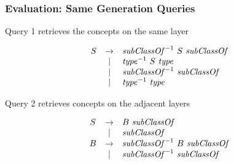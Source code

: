 \documentclass[xcolor=table]{beamer}
\begin{document}
            
\begin{frame}
  \transwipe[direction=90]
  \frametitle{Evaluation: Same Generation Queries}
Query 1 retrieves the concepts on the same layer

\begin{figure}[h]
   \[
\begin{array}{ccl}
   S & \rightarrow & \text{\emph{subClassOf}}^{-1} \ S \ \text{\emph{subClassOf}} \\ 
     & |           & \text{\emph{type}}^{-1} \ S \ \text{\emph{type}} \\ 
     & |           & \text{\emph{subClassOf}}^{-1} \ \text{\emph{subClassOf}} \\ 
     & |           & \text{\emph{type}}^{-1} \ \text{\emph{type}} \\ 
\end{array}
\]

\end{figure}

Query 2 retrieves concepts on the adjacent layers

\begin{figure}[h]
   \[
\begin{array}{ccl}
   S & \rightarrow & B \ \text{\emph{subClassOf}} \\ 
     & |           & \text{\emph{subClassOf}} \\ 
   B & \rightarrow & \text{\emph{subClassOf}}^{-1} \ B \ \text{\emph{subClassOf}} \\ 
     & |           & \text{\emph{subClassOf}}^{-1} \ \text{\emph{subClassOf}} \\ 
\end{array}
\]
\end{figure}

\end{frame}
            
\end{document}
